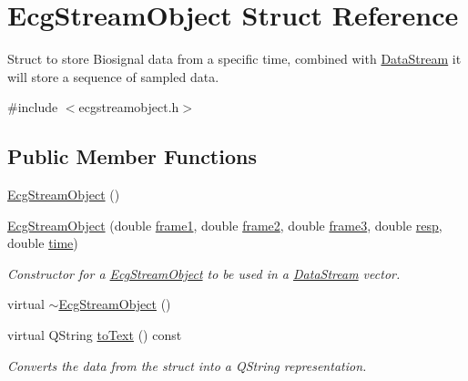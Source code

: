 \hypertarget{structEcgStreamObject}{}\section{Ecg\+Stream\+Object Struct Reference}
\label{structEcgStreamObject}


Struct to store Biosignal data from a specific time, combined with \hyperlink{classDataStream}{Data\+Stream} it will store a sequence of sampled data.  




{\ttfamily \#include $<$ecgstreamobject.\+h$>$}

\subsection*{Public Member Functions}
\begin{DoxyCompactItemize}
\item 
\hyperlink{structEcgStreamObject_ae7be034b8a6701ca31af84cf5cc6f1e2}{Ecg\+Stream\+Object} ()
\item 
\hyperlink{structEcgStreamObject_a51eafb78010c5589b8c488d89d057c60}{Ecg\+Stream\+Object} (double \hyperlink{structEcgStreamObject_ad6e113c9158619aa7305d7c95dc79d45}{frame1}, double \hyperlink{structEcgStreamObject_a7f297c636f2bb49ce4337e670f66752a}{frame2}, double \hyperlink{structEcgStreamObject_a40bfead3ce53e3a9677569dcdb80875a}{frame3}, double \hyperlink{structEcgStreamObject_ab8b391bafe34077ab3733e29d1b76b50}{resp}, double \hyperlink{structEcgStreamObject_a79a47ddd0a7c6c432d12b0da042091bf}{time})
\begin{DoxyCompactList}\small\item\em Constructor for a \hyperlink{structEcgStreamObject}{Ecg\+Stream\+Object} to be used in a \hyperlink{classDataStream}{Data\+Stream} vector. \end{DoxyCompactList}\item 
virtual \hyperlink{structEcgStreamObject_a0b44f43509360ffae050c6dedcbb59dd}{$\sim$\+Ecg\+Stream\+Object} ()
\item 
virtual Q\+String \hyperlink{structEcgStreamObject_ae988014880bd678ae693545b6b1f0175}{to\+Text} () const 
\begin{DoxyCompactList}\small\item\em Converts the data from the struct into a Q\+String representation. \end{DoxyCompactList}\end{DoxyCompactItemize}
